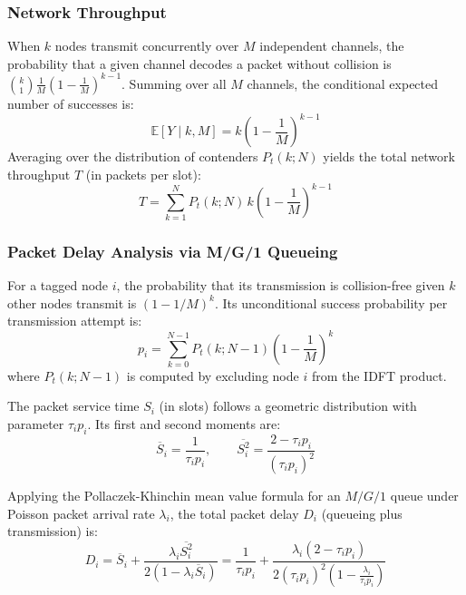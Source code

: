 \subsubsection{Network Throughput}
When $k$ nodes transmit concurrently over $M$ independent channels, the probability that a given channel decodes a packet without collision is $\binom{k}{1} \frac{1}{M} (1 - \frac{1}{M})^{k-1}$. Summing over all $M$ channels, the conditional expected number of successes is:
\begin{equation}
    \mathbb{E}[Y \mid k, M] = k \left( 1 - \frac{1}{M} \right)^{k-1}
\end{equation}
Averaging over the distribution of contenders $P_t(k; N)$ yields the total network throughput $T$ (in packets per slot):
\begin{equation}
    \label{eq:cbpf_throughput}
    T = \sum_{k=1}^N P_t(k; N) \, k \left( 1 - \frac{1}{M} \right)^{k-1}
\end{equation}

\subsubsection{Packet Delay Analysis via M/G/1 Queueing}
For a tagged node $i$, the probability that its transmission is collision-free given $k$ other nodes transmit is $(1 - 1/M)^k$. Its unconditional success probability per transmission attempt is:
\begin{equation}
    p_i = \sum_{k=0}^{N-1} P_t(k; N-1) \left( 1 - \frac{1}{M} \right)^k
\end{equation}
where $P_t(k; N-1)$ is computed by excluding node $i$ from the IDFT product.

The packet service time $S_i$ (in slots) follows a geometric distribution with parameter $\tau_i p_i$. Its first and second moments are:
\begin{equation}
    \overline{S}_i = \frac{1}{\tau_i p_i}, \qquad \overline{S_i^2} = \frac{2 - \tau_i p_i}{(\tau_i p_i)^2}
\end{equation}

Applying the Pollaczek-Khinchin mean value formula for an $M/G/1$ queue under Poisson packet arrival rate $\lambda_i$, the total packet delay $D_i$ (queueing plus transmission) is:
\begin{equation}
    \label{eq:cbpf_delay}
    D_i = \overline{S}_i + \frac{\lambda_i \overline{S_i^2}}{2(1 - \lambda_i \overline{S}_i)} = \frac{1}{\tau_i p_i} + \frac{\lambda_i (2 - \tau_i p_i)}{2 (\tau_i p_i)^2 (1 - \frac{\lambda_i}{\tau_i p_i})}
\end{equation}

